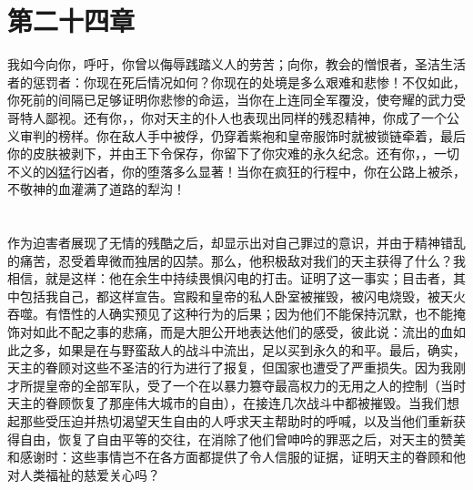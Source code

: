 
\section{第二十四章　}

我如今向你，呼吁，你曾以侮辱践踏义人的劳苦；向你，教会的憎恨者，圣洁生活者的惩罚者：你现在死后情况如何？你现在的处境是多么艰难和悲惨！不仅如此，你死前的间隔已足够证明你悲惨的命运，当你在上连同全军覆没，使夸耀的武力受哥特人鄙视。还有你，，你对天主的仆人也表现出同样的残忍精神，你成了一个公义审判的榜样。你在敌人手中被俘，仍穿着紫袍和皇帝服饰时就被锁链牵着，最后你的皮肤被剥下，并由王下令保存，你留下了你灾难的永久纪念。还有你，，一切不义的凶猛行凶者，你的堕落多么显著！当你在疯狂的行程中，你在公路上被杀，不敬神的血灌满了道路的犁沟！\par


\section{}

作为迫害者展现了无情的残酷之后，却显示出对自己罪过的意识，并由于精神错乱的痛苦，忍受着卑微而独居的囚禁。那么，他积极敌对我们的天主获得了什么？我相信，就是这样：他在余生中持续畏惧闪电的打击。证明了这一事实；目击者，其中包括我自己，都这样宣告。宫殿和皇帝的私人卧室被摧毁，被闪电烧毁，被天火吞噬。有悟性的人确实预见了这种行为的后果；因为他们不能保持沉默，也不能掩饰对如此不配之事的悲痛，而是大胆公开地表达他们的感受，彼此说：流出的血如此之多，如果是在与野蛮敌人的战斗中流出，足以买到永久的和平。最后，确实，天主的眷顾对这些不圣洁的行为进行了报复，但国家也遭受了严重损失。因为我刚才所提皇帝的全部军队，受了一个在以暴力篡夺最高权力的无用之人的控制（当时天主的眷顾恢复了那座伟大城市的自由），在接连几次战斗中都被摧毁。当我们想起那些受压迫并热切渴望天生自由的人呼求天主帮助时的呼喊，以及当他们重新获得自由，恢复了自由平等的交往，在消除了他们曾呻吟的罪恶之后，对天主的赞美和感谢时：这些事情岂不在各方面都提供了令人信服的证据，证明天主的眷顾和他对人类福祉的慈爱关心吗？\par

